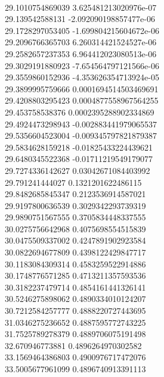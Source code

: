 { \\
29.1010754869039 3.625481213020976e-07
 \\
29.139542588131 -2.092090198857477e-06
 \\
29.1728297053405 -1.699804215604672e-06
 \\
29.2096766365703 6.260314421524527e-06
 \\
29.2582657237353 6.964412023080513e-06
 \\
29.3029191880923 -7.654564797121566e-06
 \\
29.3559860152936 -4.353626354713924e-05
 \\
29.3899995759666 0.0001694514503469691
 \\
29.4208803295423 0.0004877558967564255
 \\
29.453758538376 0.0002395288902334869
 \\
29.4924473298943 -0.002883441979065537
 \\
29.5356604523004 -0.009345797821879387
 \\
29.5834628159218 -0.01825433224439621
 \\
29.6480345522368 -0.01711219549179077
 \\
29.7274336142627 0.03042671084403992
 \\
29.791241444027 0.1321201622486115
 \\
29.8482685845347 0.2123536914587021
 \\
29.9197800636539 0.3029342293739319
 \\
29.9890751567555 0.3705834448337555
 \\
30.0275756642968 0.4075698554515839
 \\
30.0475509337002 0.4247891902923584
 \\
30.0822694677809 0.4398122429847717
 \\
30.1183084309314 0.4583259522914886
 \\
30.1748776571285 0.4713211357593536
 \\
30.3182237479714 0.4854161441326141
 \\
30.5246275898062 0.4890334010124207
 \\
30.7212584257777 0.4888220727443695
 \\
31.0346275236652 0.4887595772743225
 \\
31.7525789278379 0.4889706075191498
 \\
32.670946773881 0.4896264970302582
 \\
33.1569464386803 0.4900976717472076
 \\
33.5005677961099 0.4896740913391113
}
